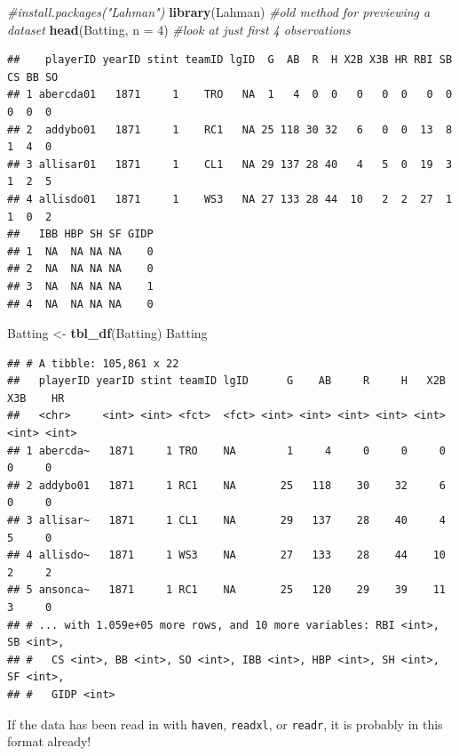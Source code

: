 \documentclass[
]{book}
\newenvironment{Shaded}{\begin{snugshade}}{\end{snugshade}}
\newcommand{\CommentTok}[1]{\textcolor[rgb]{0.56,0.35,0.01}{\textit{#1}}}
\newcommand{\DataTypeTok}[1]{\textcolor[rgb]{0.13,0.29,0.53}{#1}}
\newcommand{\DecValTok}[1]{\textcolor[rgb]{0.00,0.00,0.81}{#1}}
\newcommand{\KeywordTok}[1]{\textcolor[rgb]{0.13,0.29,0.53}{\textbf{#1}}}
\newcommand{\NormalTok}[1]{#1}
\newcommand{\StringTok}[1]{\textcolor[rgb]{0.31,0.60,0.02}{#1}}
\theoremstyle{definition}
\theoremstyle{definition}
\theoremstyle{definition}
\theoremstyle{remark}
\begin{document}
\begin{Shaded}
\begin{Highlighting}[]
\CommentTok{#install.packages("Lahman")}
\KeywordTok{library}\NormalTok{(Lahman)}
\CommentTok{#old method for previewing a dataset}
\KeywordTok{head}\NormalTok{(Batting, }\DataTypeTok{n =} \DecValTok{4}\NormalTok{) }\CommentTok{#look at just first 4 observations}
\end{Highlighting}
\end{Shaded}

\begin{verbatim}
##    playerID yearID stint teamID lgID  G  AB  R  H X2B X3B HR RBI SB CS BB SO
## 1 abercda01   1871     1    TRO   NA  1   4  0  0   0   0  0   0  0  0  0  0
## 2  addybo01   1871     1    RC1   NA 25 118 30 32   6   0  0  13  8  1  4  0
## 3 allisar01   1871     1    CL1   NA 29 137 28 40   4   5  0  19  3  1  2  5
## 4 allisdo01   1871     1    WS3   NA 27 133 28 44  10   2  2  27  1  1  0  2
##   IBB HBP SH SF GIDP
## 1  NA  NA NA NA    0
## 2  NA  NA NA NA    0
## 3  NA  NA NA NA    1
## 4  NA  NA NA NA    0
\end{verbatim}

\begin{Shaded}
\begin{Highlighting}[]
\NormalTok{Batting <-}\StringTok{ }\KeywordTok{tbl_df}\NormalTok{(Batting)}
\NormalTok{Batting}
\end{Highlighting}
\end{Shaded}

\begin{verbatim}
## # A tibble: 105,861 x 22
##   playerID yearID stint teamID lgID      G    AB     R     H   X2B   X3B    HR
##   <chr>     <int> <int> <fct>  <fct> <int> <int> <int> <int> <int> <int> <int>
## 1 abercda~   1871     1 TRO    NA        1     4     0     0     0     0     0
## 2 addybo01   1871     1 RC1    NA       25   118    30    32     6     0     0
## 3 allisar~   1871     1 CL1    NA       29   137    28    40     4     5     0
## 4 allisdo~   1871     1 WS3    NA       27   133    28    44    10     2     2
## 5 ansonca~   1871     1 RC1    NA       25   120    29    39    11     3     0
## # ... with 1.059e+05 more rows, and 10 more variables: RBI <int>, SB <int>,
## #   CS <int>, BB <int>, SO <int>, IBB <int>, HBP <int>, SH <int>, SF <int>,
## #   GIDP <int>
\end{verbatim}

If the data has been read in with \texttt{haven}, \texttt{readxl}, or \texttt{readr}, it is probably in this format already!
\end{document}
